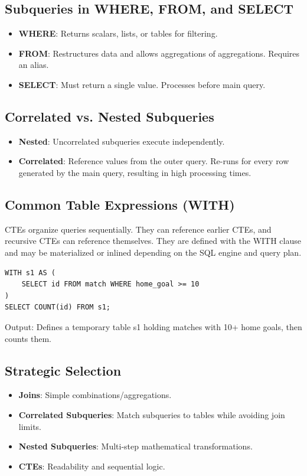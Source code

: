 \documentclass[12pt, a4paper]{article}
\begin{document}
\subsection{Subqueries in WHERE, FROM, and SELECT}
\begin{itemize}
    \item \textbf{WHERE}: Returns scalars, lists, or tables for filtering.
    \item \textbf{FROM}: Restructures data and allows aggregations of aggregations. Requires an alias.
    \item \textbf{SELECT}: Must return a single value. Processes before main query.
\end{itemize}

\subsection{Correlated vs. Nested Subqueries}
\begin{itemize}
    \item \textbf{Nested}: Uncorrelated subqueries execute independently.
    \item \textbf{Correlated}: Reference values from the outer query. Re-runs for every row generated by the main query, resulting in high processing times.
\end{itemize}

\subsection{Common Table Expressions (WITH)}
CTEs organize queries sequentially. They can reference earlier CTEs, and recursive CTEs can reference themselves. They are defined with the WITH clause and may be materialized or inlined depending on the SQL engine and query plan.

\begin{verbatim}
WITH s1 AS (
    SELECT id FROM match WHERE home_goal >= 10
) 
SELECT COUNT(id) FROM s1;
\end{verbatim}
Output: Defines a temporary table s1 holding matches with 10+ home goals, then counts them.

\subsection{Strategic Selection}
\begin{itemize}
    \item \textbf{Joins}: Simple combinations/aggregations.
    \item \textbf{Correlated Subqueries}: Match subqueries to tables while avoiding join limits.
    \item \textbf{Nested Subqueries}: Multi-step mathematical transformations.
    \item \textbf{CTEs}: Readability and sequential logic.
\end{itemize}
\end{document}
